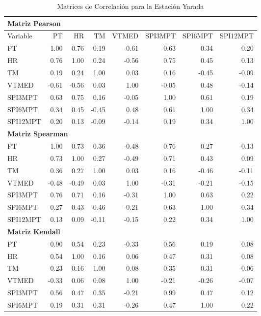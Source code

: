 \begin{table}[ht]
\centering
\caption{Matrices de Correlación para la Estación Yarada}
\begin{tabular}{lrrrrrrr}
\toprule
\multicolumn{8}{l}{\textbf{Matriz Pearson}} \\
\midrule
Variable & PT & HR & TM & VTMED & SPI3MPT & SPI6MPT & SPI12MPT \\
\midrule
PT       & 1.00 & 0.76 & 0.19 & -0.61 & 0.63 & 0.34 & 0.20 \\
HR       & 0.76 & 1.00 & 0.24 & -0.56 & 0.75 & 0.45 & 0.13 \\
TM       & 0.19 & 0.24 & 1.00 & 0.03 & 0.16 & -0.45 & -0.09 \\
VTMED    & -0.61 & -0.56 & 0.03 & 1.00 & -0.05 & 0.48 & -0.14 \\
SPI3MPT  & 0.63 & 0.75 & 0.16 & -0.05 & 1.00 & 0.61 & 0.19 \\
SPI6MPT  & 0.34 & 0.45 & -0.45 & 0.48 & 0.61 & 1.00 & 0.34 \\
SPI12MPT & 0.20 & 0.13 & -0.09 & -0.14 & 0.19 & 0.34 & 1.00 \\
\midrule
\multicolumn{8}{l}{\textbf{Matriz Spearman}} \\
\midrule
PT       & 1.00 & 0.73 & 0.36 & -0.48 & 0.76 & 0.27 & 0.13 \\
HR       & 0.73 & 1.00 & 0.27 & -0.49 & 0.71 & 0.43 & 0.09 \\
TM       & 0.36 & 0.27 & 1.00 & 0.03 & 0.16 & -0.46 & -0.11 \\
VTMED    & -0.48 & -0.49 & 0.03 & 1.00 & -0.31 & -0.21 & -0.15 \\
SPI3MPT  & 0.76 & 0.71 & 0.16 & -0.31 & 1.00 & 0.63 & 0.22 \\
SPI6MPT  & 0.27 & 0.43 & -0.46 & -0.21 & 0.63 & 1.00 & 0.34 \\
SPI12MPT & 0.13 & 0.09 & -0.11 & -0.15 & 0.22 & 0.34 & 1.00 \\
\midrule
\multicolumn{8}{l}{\textbf{Matriz Kendall}} \\
\midrule
PT       & 0.90 & 0.54 & 0.23 & -0.33 & 0.56 & 0.19 & 0.08 \\
HR       & 0.54 & 1.00 & 0.16 & 0.06 & 0.47 & 0.31 & 0.08 \\
TM       & 0.23 & 0.16 & 1.00 & 0.08 & 0.35 & 0.31 & 0.06 \\
VTMED    & -0.33 & 0.06 & 0.08 & 1.00 & -0.21 & -0.26 & -0.07 \\
SPI3MPT  & 0.56 & 0.47 & 0.35 & -0.21 & 0.99 & 0.47 & 0.12 \\
SPI6MPT  & 0.19 & 0.31 & 0.31 & -0.26 & 0.47 & 1.00 & 0.22 \\

\end{tabular}
\end{table}
